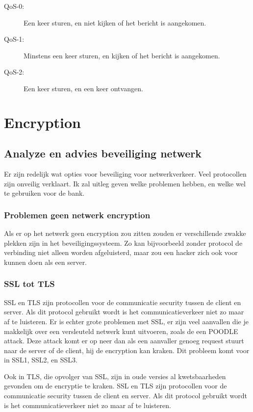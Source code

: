 \documentclass{article}
\begin{document}
\begin{description}
\item [QoS-0:] Een keer sturen, en niet kijken of het bericht is aangekomen.
\item [QoS-1:] Minstens een keer sturen, en kijken of het bericht is aangekomen.
\item [QoS-2:] Een keer sturen, en een keer ontvangen.
\end{description}

\newpage

\section{Encryption}

\subsection{Analyze en advies beveiliging netwerk} 

Er zijn redelijk wat opties voor beveiliging voor netwerkverkeer.
Veel protocollen zijn onveilig verklaart.
Ik zal uitleg geven welke problemen hebben, en welke wel te gebruiken voor de bank.

\subsubsection{Problemen geen netwerk encryption}

Als er op het netwerk geen encryption zou zitten zouden er verschillende zwakke plekken zijn in het beveiligingssysteem.
Zo kan bijvoorbeeld zonder protocol de verbinding niet alleen worden afgeluisterd, maar zou een hacker zich ook voor kunnen doen als een server.

\subsubsection{SSL tot TLS}

SSL en TLS zijn protocollen voor de communicatie security tussen de client en server.
Als dit protocol gebruikt wordt is het communicatieverkeer niet zo maar af te luisteren.
Er is echter grote problemen met SSL, er zijn veel aanvallen die je makkelijk over een versleuteld netwerk kunt uitvoeren, zoals de een POODLE attack.
Deze attack komt er op neer dan als een aanvaller genoeg request stuurt naar de server of de client, hij de encryption kan kraken.
Dit probleem komt voor in SSL1, SSL2, en SSL3.

Ook in TLS, die opvolger van SSL, zijn in oude versies al kwetsbaarheden gevonden om de encryptie te kraken.
SSL en TLS zijn protocollen voor de communicatie security tussen de client en server.
Als dit protocol gebruikt wordt is het communicatieverkeer niet zo maar af te luisteren.
\end{document}
